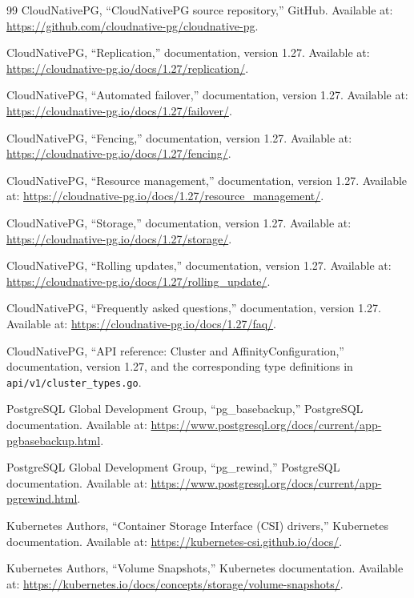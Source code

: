 \documentclass[11pt,a4paper]{article}
\begin{document}
\begin{thebibliography}{99}
CloudNativePG, ``CloudNativePG source repository,'' GitHub. Available at: \url{https://github.com/cloudnative-pg/cloudnative-pg}.

CloudNativePG, ``Replication,'' documentation, version 1.27. Available at: \url{https://cloudnative-pg.io/docs/1.27/replication/}.

CloudNativePG, ``Automated failover,'' documentation, version 1.27. Available at: \url{https://cloudnative-pg.io/docs/1.27/failover/}.

CloudNativePG, ``Fencing,'' documentation, version 1.27. Available at: \url{https://cloudnative-pg.io/docs/1.27/fencing/}.

CloudNativePG, ``Resource management,'' documentation, version 1.27. Available at: \url{https://cloudnative-pg.io/docs/1.27/resource_management/}.

CloudNativePG, ``Storage,'' documentation, version 1.27. Available at: \url{https://cloudnative-pg.io/docs/1.27/storage/}.

CloudNativePG, ``Rolling updates,'' documentation, version 1.27. Available at: \url{https://cloudnative-pg.io/docs/1.27/rolling_update/}.

CloudNativePG, ``Frequently asked questions,'' documentation, version 1.27. Available at: \url{https://cloudnative-pg.io/docs/1.27/faq/}.

CloudNativePG, ``API reference: Cluster and AffinityConfiguration,'' documentation, version 1.27, and the corresponding type definitions in \texttt{api/v1/cluster\_types.go}.

PostgreSQL Global Development Group, ``pg\_basebackup,'' PostgreSQL documentation. Available at: \url{https://www.postgresql.org/docs/current/app-pgbasebackup.html}.

PostgreSQL Global Development Group, ``pg\_rewind,'' PostgreSQL documentation. Available at: \url{https://www.postgresql.org/docs/current/app-pgrewind.html}.

Kubernetes Authors, ``Container Storage Interface (CSI) drivers,'' Kubernetes documentation. Available at: \url{https://kubernetes-csi.github.io/docs/}.

Kubernetes Authors, ``Volume Snapshots,'' Kubernetes documentation. Available at: \url{https://kubernetes.io/docs/concepts/storage/volume-snapshots/}.


\end{thebibliography}
\end{document}
